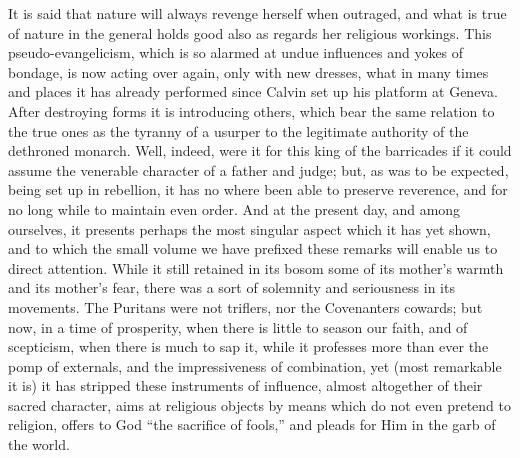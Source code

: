 It is said
that nature will always revenge herself when outraged, and what is true
of nature in the general holds good also as regards her religious
workings. This pseudo-evangelicism, which is so alarmed at undue
influences and yokes of bondage, is now acting over again, only with new
dresses, what in many times and places it has already performed since
Calvin set up his platform at Geneva. After destroying forms it is
introducing others, which bear the same relation to the true ones as the
tyranny of a usurper to the legitimate authority of the dethroned
monarch. Well, indeed, were it for this king of the barricades if it
could assume the venerable character of a father and judge; but, as was
to be expected, being set up in rebellion, it has no where been able to
preserve reverence, and for no long while to maintain even order. And at
the present day, and among ourselves, it presents perhaps the most
singular aspect which it has yet shown, and to which the small volume we
have prefixed these remarks will enable us to direct attention. While it
still retained in its bosom some of its mother's warmth and its
mother's fear, there was a sort of solemnity and seriousness in its
movements. The Puritans were not triflers, nor the Covenanters cowards;
but now, in a time of prosperity, when there is little to season our
faith, and of scepticism, when there is much to sap it, while it
professes more than ever the pomp of externals, and the impressiveness
of combination, yet (most remarkable it is) it has stripped these
instruments of influence, almost altogether of their sacred character,
aims at religious objects by means which do not even pretend to
religion, offers to God ``the sacrifice of fools,'' and pleads for Him
in the garb of the world.

